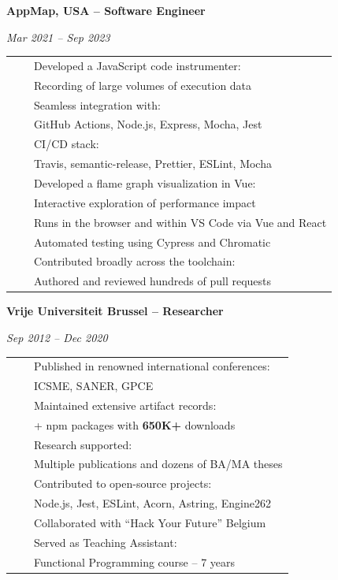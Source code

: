 \documentclass[a4paper,11pt,english]{article}
\newcommand{\RightColumn}[0]{10.5cm}
\newcommand{\ItemSkip}[0]{4pt}
\newcommand{\SubItemSkip}[0]{0pt}
\newcommand{\SubSubItemSkip}[0]{0pt}
\newcommand{\Bullet}[0]{\faCaretRight~~}
\newcommand{\BeginSubRubricSkip}[0]{6pt}
\newcommand{\EndSubRubric}[0]{\vspace{4pt}}
\newcommand{\SubRubric}[1]{\parbox{\linewidth}{\sffamily\bfseries{}#1}}
\begin{document}
\begin{minipage}[t]{\RightColumn}
\SubRubric{AppMap, USA -- Software Engineer}
\emph{Mar 2021 -- Sep 2023} \\[\BeginSubRubricSkip]
\begin{tabularx}{\linewidth}{@{}l@{}l@{}}
\Bullet & Developed a JavaScript code instrumenter: \\[\SubItemSkip]
& \quad Recording of large volumes of execution data \\[\SubItemSkip]
& \quad Seamless integration with: \\[\SubSubItemSkip]
& \quad \quad GitHub Actions, Node.js, Express, Mocha, Jest \\[\SubItemSkip]
& \quad CI/CD stack: \\[\SubSubItemSkip]
& \quad \quad Travis, semantic-release, Prettier, ESLint, Mocha \\[\ItemSkip]
\Bullet & Developed a flame graph visualization in Vue: \\[\SubItemSkip]
& \quad Interactive exploration of performance impact \\[\SubItemSkip]
& \quad Runs in the browser and within VS Code via Vue and React \\[\SubItemSkip]
& \quad Automated testing using Cypress and Chromatic \\[\ItemSkip]
\Bullet & Contributed broadly across the toolchain: \\[\SubItemSkip]
& \quad Authored and reviewed hundreds of pull requests \\[\ItemSkip]
\end{tabularx}
\EndSubRubric{}

\SubRubric{Vrije Universiteit Brussel -- Researcher}
\emph{Sep 2012 -- Dec 2020} \\[\BeginSubRubricSkip]
\begin{tabularx}{\linewidth}{@{}l@{}l@{}}
\Bullet & Published in renowned international conferences: \\[\SubSubItemSkip]
& \quad ICSME, SANER, GPCE \\[\ItemSkip]
\Bullet & Maintained extensive artifact records: \\[\SubSubItemSkip]
& \quad 60+ npm packages with \textbf{650K+} downloads \\[\ItemSkip]
\Bullet & Research supported: \\[\SubSubItemSkip]
& \quad Multiple publications and dozens of BA/MA theses \\[\ItemSkip]
\Bullet & Contributed to open-source projects: \\[\SubSubItemSkip]
& \quad Node.js, Jest, ESLint, Acorn, Astring, Engine262 \\[\ItemSkip]
\Bullet & Collaborated with ``Hack Your Future'' Belgium \\[\ItemSkip]
\Bullet & Served as Teaching Assistant: \\[\SubSubItemSkip]
& \quad Functional Programming course -- 7 years \\[\ItemSkip]
\end{tabularx}
\EndSubRubric{}


\end{minipage}
\end{document}
